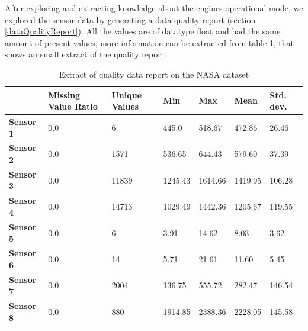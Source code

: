 \documentclass[english, a4paper]{report}
\begin{document}
{{{{                After exploring and extracting knowledge about the engines operational mode, we explored the sensor data by generating a data quality report (section \ref{dataQualityReport}). All the values are of datatype float and had the same amount of present values, more information can be extracted from table \ref{nasaDQR}, that shows an small extract of the quality report.
                
                \begin{table}[H]
                    \centering
                    \begin{tabular}{|l|l|l|l|l|l|l|}
                        \hline
                        \textbf{}         & \textbf{Missing Value Ratio} & \textbf{Unique Values} & \textbf{Min} & \textbf{Max} & \textbf{Mean} & \textbf{Std. dev.} \\ \hline
                        \textbf{Sensor 1} & 0.0                          & 6                      & 445.0        & 518.67       & 472.86        & 26.46              \\ \hline
                        \textbf{Sensor 2} & 0.0                          & 1571                   & 536.65       & 644.43       & 579.60        & 37.39              \\ \hline
                        \textbf{Sensor 3} & 0.0                          & 11839                  & 1245.43      & 1614.66      & 1419.95       & 106.28             \\ \hline
                        \textbf{Sensor 4} & 0.0                          & 14713                  & 1029.49      & 1442.36      & 1205.67       & 119.55             \\ \hline
                        \textbf{Sensor 5} & 0.0                          & 6                      & 3.91         & 14.62        & 8.03          & 3.62               \\ \hline
                        \textbf{Sensor 6} & 0.0                          & 14                     & 5.71         & 21.61        & 11.60         & 5.45               \\ \hline
                        \textbf{Sensor 7} & 0.0                          & 2004                   & 136.75       & 555.72       & 282.47        & 146.54             \\ \hline
                        \textbf{Sensor 8} & 0.0                          & 880                    & 1914.85      & 2388.36      & 2228.05       & 145.58             \\ \hline
                    \end{tabular}
                    \caption{Extract of quality data report on the NASA dataset}
                    \label{nasaDQR}
                \end{table}
                
}}}}
\end{document}
